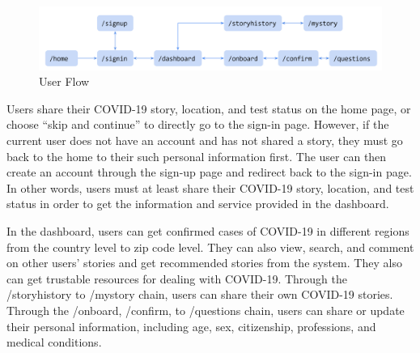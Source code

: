 \documentclass{ucsdreport}
\begin{document}
\begin{figure}[H]
    \centering
    \includegraphics[scale=0.3]{images/userflow.png}
    \caption{User Flow}
\end{figure}


Users share their COVID-19 story, location, and test status on the home page,
or choose “skip and continue” to directly go to the sign-in page. However, if
the current user does not have an account and has not shared a story, they must
go back to the home to their such personal information first. The user can then
create an account through the sign-up page and redirect back to the sign-in 
page. In other words, users must at least share their  COVID-19 story, 
location, and test status in order to get the information and service provided
in the dashboard. 


In the dashboard, users can get confirmed cases of COVID-19 in different 
regions from the country level to zip code level. They can also view, search,
and comment on other users’ stories and get recommended stories from the system.
They also can get trustable resources for dealing with COVID-19. Through the
/storyhistory to /mystory chain, users can share their own COVID-19 stories. 
Through the /onboard, /confirm, to /questions chain, users can share or update 
their personal information, including age, sex, citizenship, professions, and
medical conditions. 
\end{document}
